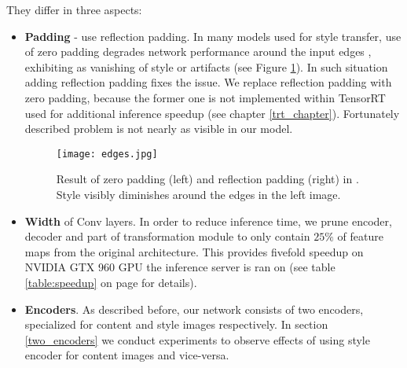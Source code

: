 \documentclass[../Main.tex]{subfiles}
\begin{document}
    They differ in three aspects:
    \begin{itemize}
        \item \textbf{Padding} - \cite{Li2018} use reflection padding. In many
        models used for style transfer, use of zero padding degrades network
        performance around the input edges \cite{johnson2016perceptual}, exhibiting as
        vanishing of style or artifacts (see Figure \ref{fig:edges}).
        In such situation adding reflection padding fixes the issue. We replace
        reflection padding with zero padding, because the former one is not 
        implemented within TensorRT used for additional inference speedup
        (see chapter \ref{trt_chapter}). Fortunately described problem is not nearly as visible
        in our model.
        \begin{figure}[ht!]
            \texttt{[image: edges.jpg]}
            \caption{Result of zero padding (left) and reflection padding (right)
                in \cite{johnson2016perceptual}. Style visibly diminishes around
                the edges in the left image.
            }
            \label{fig:edges}
        \end{figure}
        \item \textbf{Width} of Conv layers. In order to reduce inference time,
        we prune encoder, decoder and part of transformation module
        to only contain $25\%$ of feature maps from the original architecture.
        This provides 
        fivefold speedup on NVIDIA GTX 960 GPU the inference server is ran on 
        (see table \ref{table:speedup} on page \pageref{table:speedup} for details).
        \item \textbf{Encoders}. As described before, our network consists of two encoders, specialized
        for content and style images respectively. In section \ref{two_encoders}
        we conduct experiments to observe effects of using style encoder for 
        content images and vice-versa.
        
    \end{itemize}
\end{document}
